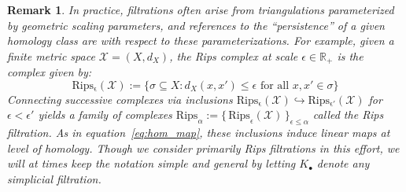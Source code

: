 \documentclass[10pt]{article}
\newtheorem{remark}{Remark}
\begin{document}
\begin{remark}
\normalfont In practice, filtrations often arise from triangulations parameterized by geometric scaling parameters, and references to the ``persistence'' of a given homology class are with respect to these parameterizations. For example, given a finite metric space $\mathcal{X} = (X, d_X)$, the \emph{Rips complex} at scale $\epsilon \in \mathbb{R}_{+}$ is the complex given by: 
\begin{equation}
	\mathrm{Rips_{\epsilon}}(\mathcal{X}) := \{ \sigma \subseteq X : d_X(x, x') \leq \epsilon \text{ for all } x, x' \in \sigma \} 
\end{equation}
\noindent Connecting successive complexes via inclusions $\mathrm{Rips_{\epsilon}}(\mathcal{X}) \hookrightarrow \mathrm{Rips_{\epsilon'}}(\mathcal{X})$ for $\epsilon < \epsilon'$ yields a family of complexes $\mathrm{Rips}_{\alpha} := \{ \, \mathrm{Rips}_\epsilon(\mathcal{X}) \, \}_{\epsilon \leq \alpha}$ called the \emph{Rips filtration}. 
As in equation~\eqref{eq:hom_map}, these inclusions induce linear maps at level of homology. Though we consider primarily Rips filtrations in this effort, we will at times keep the notation simple and general by letting $K_\bullet$ denote any simplicial filtration. 
\end{remark} 

\end{document}
